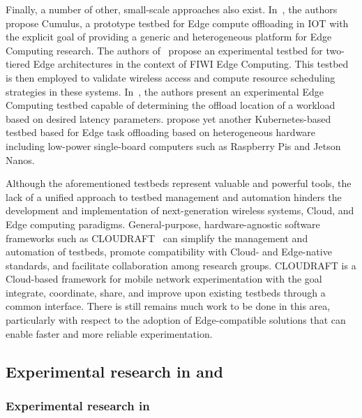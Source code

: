 Finally, a number of other, small-scale approaches also exist.
In~\cite{gedawy2016cumulus}, the authors propose Cumulus, a prototype testbed for Edge compute offloading in \gls{IOT} with the explicit goal of providing a generic and heterogeneous platform for Edge Computing research.
The authors of~\cite{rimal2018experimental} propose an experimental testbed for two-tiered Edge architectures in the context of \gls{FIWI} Edge Computing.
This testbed is then employed to validate wireless access and compute resource scheduling strategies in these systems.
In~\cite{yamanaka2021design}, the authors present an experimental Edge Computing testbed capable of determining the offload location of a workload based on desired latency parameters.
\cite{diao2019scalable} propose yet another Kubernetes-based testbed based for Edge task offloading based on heterogeneous hardware including low-power single-board computers such as Raspberry Pis and Jetson Nanos.

Although the aforementioned testbeds represent valuable and powerful tools, the lack of a unified approach to testbed management and automation hinders the development and implementation of next-generation wireless systems, Cloud, and Edge computing paradigms.
General-purpose, hardware-agnostic software frameworks such as \gls{CLOUDRAFT}~\cite{moorthy2022cloudraft}  can simplify the management and automation of testbeds, promote compatibility with Cloud- and Edge-native standards, and facilitate collaboration among research groups.
\gls{CLOUDRAFT} is a Cloud-based framework for mobile network experimentation with the goal integrate, coordinate, share, and improve upon existing testbeds through a common interface.
There is still remains much work to be done in this area, particularly with respect to the adoption of Edge-compatible solutions that can enable faster and more reliable experimentation.

\subsection{Experimental research in  and }

\subsubsection{Experimental research in }\label{sec:relwork:xremulation}

